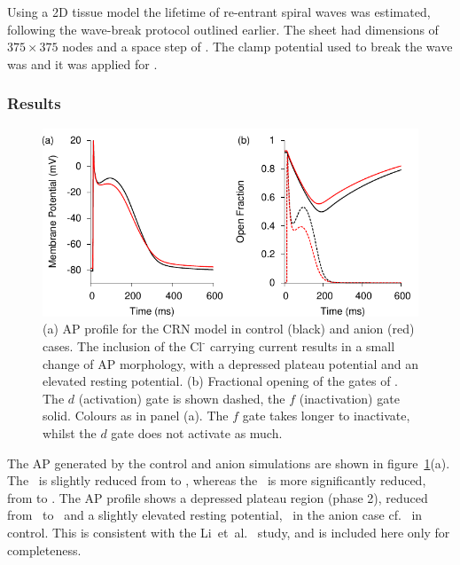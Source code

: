 Using a 2D tissue model the lifetime of re-entrant spiral waves was estimated,
following the wave-break protocol outlined earlier.  The sheet had dimensions of
$375\times375$ nodes and a space step of .  The clamp potential used
to break the wave was  and it was applied for .

\subsubsection{Results}


\begin{figure}
\begin{center}
\includegraphics{figures/toolkit/anion/figures/01_AP}
\end{center}
\caption[Anion Current AP Profiles and \ gating parameters]{
\label{fig:tookit:anion:ap}
(a) AP profile for the CRN model in control (black) and anion (red) cases.
The inclusion of the $\text{Cl}^{\text{-}}$ carrying current results in a small
change of AP morphology, with a depressed plateau potential and an elevated
resting potential.
(b) Fractional opening of the gates of .
The $d$ (activation) gate is shown dashed, the $f$ (inactivation) gate solid.
Colours as in panel (a).
The $f$ gate takes longer to inactivate, whilst the $d$ gate does not activate
as much.
}
\end{figure}

The AP generated by the control and anion simulations are shown in
figure~\ref{fig:tookit:anion:ap}(a).
The \apd\ is slightly reduced from  to , whereas the
\apd[50]\ is more significantly reduced, from  to .
The AP profile shows a depressed plateau region (phase 2), reduced from
\ to \ and a slightly elevated resting potential,
\ in the anion case cf. \ in control.
This is consistent with the Li~et~al.~\cite{Li2007} study, and is included here
only for completeness.

